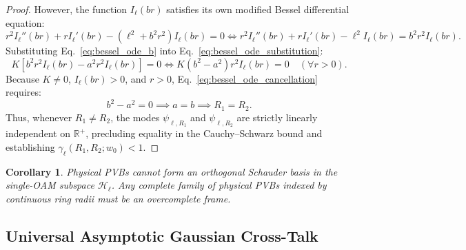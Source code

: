 \documentclass[11pt,a4paper]{article}
\newtheorem{corollary}{Corollary}
\begin{document}
\begin{proof}
However, the function $I_\ell(b r)$ satisfies its own modified Bessel differential equation:
\begin{equation}
r^2 I_\ell''(b r) + r I_\ell'(b r) - (\ell^2 + b^2 r^2) I_\ell(b r) = 0 \iff r^2 I_\ell''(b r) + r I_\ell'(b r) - \ell^2 I_\ell(b r) = b^2 r^2 I_\ell(b r).
\label{eq:bessel_ode_b}
\end{equation}
Substituting Eq.~\eqref{eq:bessel_ode_b} into Eq.~\eqref{eq:bessel_ode_substitution}:
\begin{equation}
K \left[ b^2 r^2 I_\ell(b r) - a^2 r^2 I_\ell(b r) \right] = 0 \iff K (b^2 - a^2) r^2 I_\ell(b r) = 0 \quad (\forall r > 0).
\label{eq:bessel_ode_cancellation}
\end{equation}
Because $K \neq 0$, $I_\ell(b r) > 0$, and $r > 0$, Eq.~\eqref{eq:bessel_ode_cancellation} requires:
\begin{equation}
b^2 - a^2 = 0 \implies a = b \implies R_1 = R_2.
\label{eq:ode_conclusion}
\end{equation}
Thus, whenever $R_1 \neq R_2$, the modes $\psi_{\ell, R_1}$ and $\psi_{\ell, R_2}$ are strictly linearly independent on $\mathbb{R}^+$, precluding equality in the Cauchy--Schwarz bound and establishing $\gamma_\ell(R_1, R_2; w_0) < 1$.
\end{proof}

\begin{corollary}
Physical PVBs cannot form an orthogonal Schauder basis in the single-OAM subspace $\mathcal{H}_\ell$. Any complete family of physical PVBs indexed by continuous ring radii must be an overcomplete frame.
\end{corollary}

\subsection{Universal Asymptotic Gaussian Cross-Talk}
\end{document}
